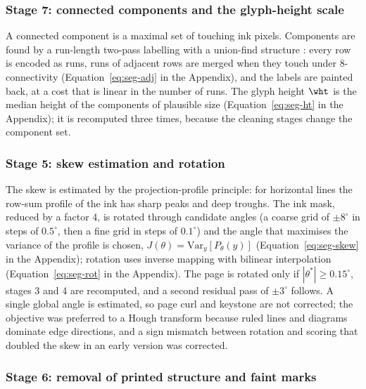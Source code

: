 \subsubsection{Stage 7: connected components and the glyph-height scale}

A connected component is a maximal set of touching ink pixels.
Components are found by a run-length two-pass labelling with a union-find structure \cite{tarjan1975,rosenfeld1966}: every row is encoded as runs, runs of adjacent rows are merged when they touch under 8-connectivity (Equation~\ref{eq:seg-adj} in the Appendix), and the labels are painted back, at a cost that is linear in the number of runs.
The glyph height $\wht$ is the median height of the components of plausible size (Equation~\ref{eq:seg-ht} in the Appendix); it is recomputed three times, because the cleaning stages change the component set.

\subsubsection{Stage 5: skew estimation and rotation}

The skew is estimated by the projection-profile principle: for horizontal lines the row-sum profile of the ink has sharp peaks and deep troughs.
The ink mask, reduced by a factor 4, is rotated through candidate angles (a coarse grid of $\pm8^\circ$ in steps of $0.5^\circ$, then a fine grid in steps of $0.1^\circ$) and the angle that maximises the variance of the profile is chosen, $J(\theta)=\mathrm{Var}_y[P_\theta(y)]$ (Equation~\ref{eq:seg-skew} in the Appendix); rotation uses inverse mapping with bilinear interpolation (Equation~\ref{eq:seg-rot} in the Appendix).
The page is rotated only if $|\theta^*|\ge0.15^\circ$, stages 3 and 4 are recomputed, and a second residual pass of $\pm3^\circ$ follows.
A single global angle is estimated, so page curl and keystone are not corrected; the objective was preferred to a Hough transform because ruled lines and diagrams dominate edge directions, and a sign mismatch between rotation and scoring that doubled the skew in an early version was corrected.

\subsubsection{Stage 6: removal of printed structure and faint marks}

